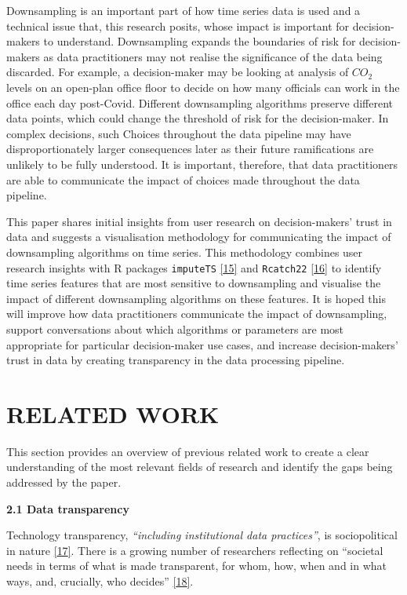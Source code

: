 \documentclass{article}
\begin{document}
Downsampling is an important part of how time series data is used and a
technical issue that, this research posits, whose impact is important
for decision-makers to understand. Downsampling expands the boundaries
of risk for decision-makers as data practitioners may not realise the
significance of the data being discarded. For example, a decision-maker
may be looking at analysis of \(CO_2\) levels on an open-plan office
floor to decide on how many officials can work in the office each day
post-Covid. Different downsampling algorithms preserve different data
points, which could change the threshold of risk for the decision-maker.
In complex decisions, such Choices throughout the data pipeline may have
disproportionately larger consequences later as their future
ramifications are unlikely to be fully understood. It is important,
therefore, that data practitioners are able to communicate the impact of
choices made throughout the data pipeline.

This paper shares initial insights from user research on
decision-makers' trust in data and suggests a visualisation methodology
for communicating the impact of downsampling algorithms on time series.
This methodology combines user research insights with R packages
\texttt{imputeTS} \protect\hyperlink{ref-imputeTS_R}{{[}15{]}} and
\texttt{Rcatch22} \protect\hyperlink{ref-catch22_R}{{[}16{]}} to
identify time series features that are most sensitive to downsampling
and visualise the impact of different downsampling algorithms on these
features. It is hoped this will improve how data practitioners
communicate the impact of downsampling, support conversations about
which algorithms or parameters are most appropriate for particular
decision-maker use cases, and increase decision-makers' trust in data by
creating transparency in the data processing pipeline.

\hypertarget{related-work}{%
\section{RELATED WORK}\label{related-work}}

This section provides an overview of previous related work to create a
clear understanding of the most relevant fields of research and identify
the gaps being addressed by the paper.

\textbf{2.1 Data transparency}

Technology transparency, \emph{``including institutional data
practices''}, is sociopolitical in nature
\protect\hyperlink{ref-political_transparency}{{[}17{]}}. There is a
growing number of researchers reflecting on ``societal needs in terms of
what is made transparent, for whom, how, when and in what ways, and,
crucially, who decides''
\protect\hyperlink{ref-social_transparency}{{[}18{]}}.
\end{document}
